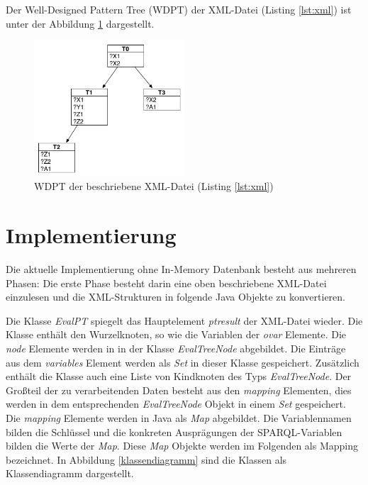 \documentclass[draft,final]{vutinfth} %
\begin{document}
Der Well-Designed Pattern Tree (WDPT) der XML-Datei (Listing \ref{lst:xml}) ist unter der Abbildung \ref{wdptBsp} dargestellt.
\begin{figure}[ht]
	\centering
	\includegraphics[width=0.5\textwidth]{WDPT}
	\caption{WDPT der beschriebene XML-Datei (Listing \ref{lst:xml})}
	\label{wdptBsp}
\end{figure}

\section{Implementierung} \label{istImp}

Die aktuelle Implementierung ohne In-Memory Datenbank besteht aus mehreren Phasen:
Die erste Phase besteht darin eine oben beschriebene XML-Datei einzulesen und die XML-Strukturen in folgende Java Objekte zu konvertieren.

Die Klasse \textit{EvalPT} spiegelt das Hauptelement \textit{ptresult} der XML-Datei wieder. Die Klasse enthält den Wurzelknoten, so wie die Variablen der \textit{ovar} Elemente. Die \textit{node} Elemente werden in in der Klasse \textit{EvalTreeNode} abgebildet. Die Einträge aus dem \textit{variables} Element werden als \textit{Set} in dieser Klasse gespeichert. Zusätzlich enthält die Klasse auch eine Liste von Kindknoten des Typs \textit{EvalTreeNode}. Der Gro\ss teil der zu verarbeitenden Daten besteht aus den \textit{mapping} Elementen, dies werden in dem entsprechenden \textit{EvalTreeNode} Objekt in einem \textit{Set} gespeichert. Die \textit{mapping} Elemente werden in Java als \textit{Map} abgebildet. Die Variablennamen bilden die Schlüssel und die konkreten Ausprägungen der SPARQL-Variablen bilden die Werte der \textit{Map}. Diese \textit{Map} Objekte werden im Folgenden als Mapping bezeichnet. In Abbildung \ref{klassendiagramm} sind die Klassen als Klassendiagramm dargestellt. 
\end{document}

